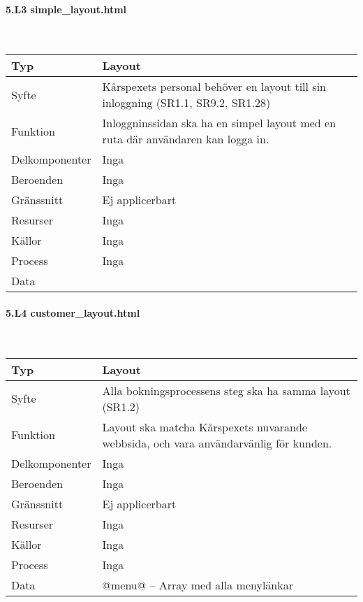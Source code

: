 \documentclass[a4paper, twoside, 11pt, titlepage]{article}
\begin{document}
			\paragraph{5.L3 simple\_layout.html}\

			\begin {table} [ht] \begin{tabular} {  p{3.5cm} p{9.6cm} }
				\hline
				Typ & Layout  \\
				\hline
				Syfte & Kårspexets personal behöver en layout till sin inloggning (SR1.1, SR9.2, SR1.28)  \\
				\hline
				Funktion & Inloggninssidan ska ha en simpel layout med en ruta där användaren kan logga in.  \\
				\hline
				Delkomponenter & Inga  \\
				\hline
				Beroenden & Inga  \\
				\hline
				Gränssnitt & Ej applicerbart  \\
				\hline
				Resurser & Inga  \\
				\hline
				Källor & Inga  \\
				\hline
				Process & Inga  \\
				\hline
				Data &   \\
				\hline
			\end{tabular} \end{table} \FloatBarrier


			\paragraph{5.L4 customer\_layout.html}\

			\begin {table} [ht] \begin{tabular} {  p{3.5cm} p{9.6cm} }
				\hline
				Typ & Layout  \\
				\hline
				Syfte & Alla bokningsprocessens steg ska ha samma layout (SR1.2)  \\
				\hline
				Funktion & Layout ska matcha Kårspexets nuvarande webbsida, och vara användarvänlig för kunden.  \\
				\hline
				Delkomponenter & Inga  \\
				\hline
				Beroenden & Inga  \\
				\hline
				Gränssnitt & Ej applicerbart  \\
				\hline
				Resurser & Inga  \\
				\hline
				Källor & Inga  \\
				\hline
				Process & Inga  \\
				\hline
				Data & @menu@ – Array med alla menylänkar  \\
				\hline
			\end{tabular} \end{table} \FloatBarrier
\end{document}
